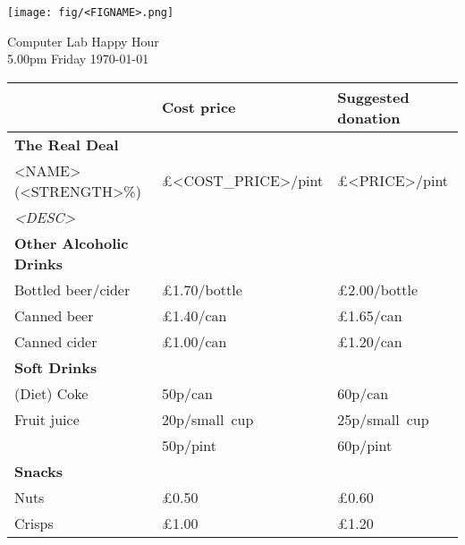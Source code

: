 \documentclass[a4paper,12pt]{article}
\begin{document}
\begin{center}
	\texttt{[image: fig/<FIGNAME>.png]} \par \bigskip \bigskip \bigskip
    {\Large Computer Lab Happy Hour} \\ \smallskip
    {5.00pm Friday \today}
\end{center}

\bigskip

\large
\begin{center}

\def\arraystretch{1.1}

\begin{tabular}{p{7.5cm}|p{3cm}|p{3cm}} & \textbf{Cost price} & \textbf{Suggested donation} \\
\hline
\textbf{The Real Deal} & & \\
<NAME> (<STRENGTH>\%) & \pounds <COST_PRICE>/pint & \pounds <PRICE>/pint \\
\small \it <DESC> \medskip & & \\

\hline
{\bf Other Alcoholic Drinks} & & \\
Bottled beer/cider & \pounds 1.70/bottle & \pounds 2.00/bottle \\
Canned beer & \pounds 1.40/can & \pounds 1.65/can \\
Canned cider & \pounds 1.00/can & \pounds 1.20/can \medskip \\

\hline
{\bf Soft Drinks} &&\\
(Diet) Coke & 50p/can  & 60p/can \\
Fruit juice & 20p/small~cup & 25p/small~cup \\
& 50p/pint & 60p/pint \medskip \\

\hline
{\bf Snacks} & & \\
Nuts &\pounds 0.50 &\pounds 0.60 \\
Crisps &\pounds 1.00 &\pounds 1.20 \\

\end{tabular}
\end{center}
\end{document}
